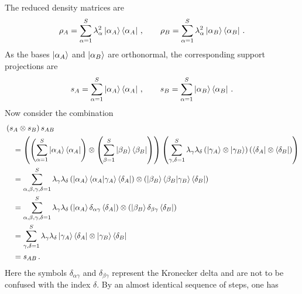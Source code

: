 \documentclass[12pt]{article}
\numberwithin{equation}{section}
\begin{document}
The reduced density matrices are
%
\begin{align}
    \rho_A = \sum_{\alpha = 1}^{S} \lambda_\alpha^2 \ket{\alpha_A} \bra{\alpha_A} \, , \qquad  \rho_B = \sum_{\alpha = 1}^{S} \lambda_\alpha^2 \ket{\alpha_B} \bra{\alpha_B} \, .
\end{align}
%
As the bases $\ket{\alpha_A}$ and $\ket{\alpha_B}$ are orthonormal, the corresponding support projections are
%
\begin{align}
    s_A = \sum_{\alpha = 1}^{S} \ket{\alpha_A} \bra{\alpha_A} \, , \qquad s_B = \sum_{\alpha = 1}^{S} \ket{\alpha_B} \bra{\alpha_B} \, .
\end{align}
%
Now consider the combination
%
\begin{align}
    &\left( s_A \otimes s_B \right) s_{AB} \nonumber \\
    &\quad = \left( \left( \sum_{\alpha = 1}^{S} \ket{\alpha_A} \bra{\alpha_A} \right) \otimes \left( \sum_{\beta = 1}^{S} \ket{\beta_B} \bra{\beta_B} \right) \right) \left( \sum_{\gamma, \delta = 1}^{S} \lambda_\gamma \lambda_\delta \left( \ket{ \gamma_A } \otimes \ket{\gamma_B } \right) \left( \bra{\delta_A} \otimes \bra{\delta_B} \right)  \right) \nonumber \\
    &\quad = \sum_{\alpha, \beta, \gamma, \delta = 1}^{S} \lambda_\gamma \lambda_\delta \left( \ket{\alpha_A} \braket{\alpha_A}{\gamma_A} \bra{\delta_A} \right) \otimes \left( \ket{\beta_B} \braket{\beta_B}{\gamma_B} \bra{\delta_B} \right) \nonumber \\
    &\quad = \sum_{\alpha, \beta, \gamma, \delta = 1}^{S} \lambda_\gamma \lambda_\delta \left( \ket{\alpha_A} \delta_{\alpha \gamma} \bra{\delta_A} \right) \otimes \left( \ket{\beta_B} \delta_{\beta \gamma} \bra{\delta_B} \right) \nonumber \\
    &\quad = \sum_{\gamma, \delta = 1}^{S} \lambda_\gamma \lambda_\delta \ket{\gamma_A} \bra{\delta_A} \otimes \ket{\gamma_B} \bra{\delta_B} \nonumber \\
    &\quad = s_{AB} \, .
\end{align}
%
Here the symbols $\delta_{\alpha \gamma}$ and $\delta_{\beta \gamma}$ represent the Kronecker delta and are not to be confused with the index $\delta$. By an almost identical sequence of steps, one has
%
\end{document}
